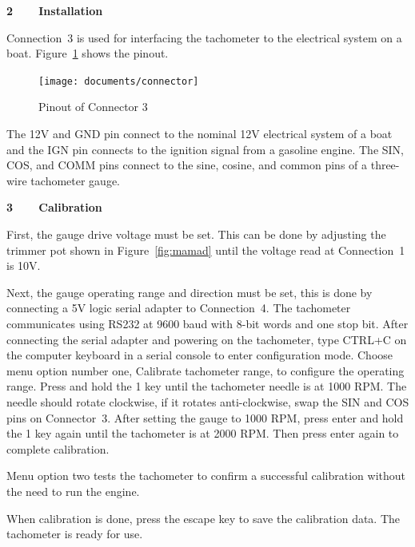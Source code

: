 \documentclass[11pt]{article}
\begin{document}
{\large\textbf{2~~~~Installation}}

Connection~3 is used for interfacing the tachometer to the electrical system on a boat. Figure~\ref{fig:boatcond} shows the pinout.

\begin{figure}[H]
    \centering
    \texttt{[image: documents/connector]}
    \caption{Pinout of Connector 3}
    \label{fig:boatcond}
\end{figure}

The 12V and GND pin connect to the nominal 12V electrical system of a boat and the IGN pin connects to the ignition signal from a gasoline engine. The SIN, COS, and COMM pins connect to the sine, cosine, and common pins of a three-wire  tachometer gauge.

{\large\textbf{3~~~~Calibration}}

First, the  gauge drive voltage must be set. This can be done by adjusting the trimmer pot shown in Figure~\ref{fig:mamad} until the voltage read at Connection~1 is 10V.

Next, the  gauge operating range and direction must be set, this is done by connecting a 5V logic serial adapter to Connection~4. The tachometer communicates using RS232 at 9600 baud with 8-bit words and one stop bit. After connecting the serial adapter and powering on the tachometer, type CTRL+C on the computer keyboard in a serial console to enter configuration mode. Choose menu option number one, Calibrate tachometer range, to configure the operating range. Press and hold the 1 key until the tachometer needle is at 1000 RPM. The needle should rotate clockwise, if it rotates anti-clockwise, swap the SIN and COS pins on Connector~3. After setting the gauge to 1000 RPM, press enter and hold the 1 key again until the tachometer is at 2000 RPM. Then press enter again to complete calibration.

Menu option two tests the tachometer to confirm a successful calibration without the need to run the engine.

When calibration is done, press the escape key to save the calibration data. The tachometer is ready for use.
\end{document}
